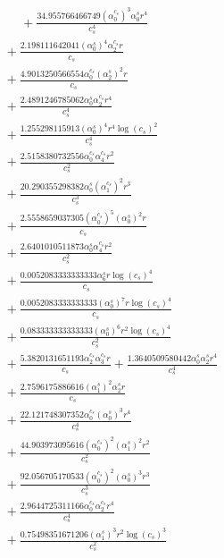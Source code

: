 \documentclass[10pt]{article}
\begin{document}
\begin{align*}
\phantom{R_{2,8}} &\phantom{={}}{}  + \frac{34.955766466749 \left(\alpha_{0}^{c_s}\right)^{3} \alpha_{0}^s r^{4}}{c_{s}^{4}} \\
&{}  + \frac{2.198111642041 \left(\alpha_{0}^s\right)^{4} \alpha_{2}^{c_s} r}{c_{s}} \\
&{}  + \frac{4.9013250566554 \alpha_{0}^{c_s} \left(\alpha_{2}^s\right)^{2} r}{c_{s}} \\
&{}  + \frac{2.4891246785062 \alpha_{0}^s \alpha_{2}^{c_s} r^{4}}{c_{s}^{4}} \\
&{}  + \frac{1.255298115913 \left(\alpha_{0}^s\right)^{4} r^{4} \log{\left(c_{s} \right)}^{2}}{c_{s}^{4}} \\
&{}  + \frac{2.5158380732556 \alpha_{0}^{c_s} \alpha_{4}^{c_s} r^{2}}{c_{s}^{2}} \\
&{}  + \frac{20.290355298382 \alpha_{0}^s \left(\alpha_{1}^{c_s}\right)^{2} r^{3}}{c_{s}^{3}} \\
&{}  + \frac{2.5558659037305 \left(\alpha_{0}^{c_s}\right)^{5} \left(\alpha_{0}^s\right)^{2} r}{c_{s}} \\
&{}  + \frac{2.6401010511873 \alpha_{0}^s \alpha_{4}^{c_s} r^{2}}{c_{s}^{2}} \\
&{}  + \frac{0.0052083333333333 \alpha_{6}^s r \log{\left(c_{s} \right)}^{4}}{c_{s}} \\
&{}  + \frac{0.0052083333333333 \left(\alpha_{0}^s\right)^{7} r \log{\left(c_{s} \right)}^{4}}{c_{s}} \\
&{}  + \frac{0.083333333333333 \left(\alpha_{0}^s\right)^{6} r^{2} \log{\left(c_{s} \right)}^{4}}{c_{s}^{2}} \\
&{}  + \frac{5.3820131651193 \alpha_{2}^{c_s} \alpha_{3}^{c_s} r}{c_{s}} + \frac{1.3640509580442 \alpha_{0}^s \alpha_{2}^s r^{4}}{c_{s}^{4}} \\
&{}  + \frac{2.7596175886616 \left(\alpha_{1}^s\right)^{2} \alpha_{2}^s r}{c_{s}} \\
&{}  + \frac{22.121748307352 \alpha_{0}^{c_s} \left(\alpha_{0}^s\right)^{3} r^{4}}{c_{s}^{4}} \\
&{}  + \frac{44.903973095616 \left(\alpha_{0}^{c_s}\right)^{2} \left(\alpha_{1}^s\right)^{2} r^{2}}{c_{s}^{2}} \\
&{}  + \frac{92.056705170533 \left(\alpha_{0}^{c_s}\right)^{2} \left(\alpha_{0}^s\right)^{3} r^{3}}{c_{s}^{3}} \\
&{}  + \frac{2.9644725311166 \alpha_{0}^{c_s} \alpha_{2}^{c_s} r^{4}}{c_{s}^{4}} \\
&{}  + \frac{0.75498351671206 \left(\alpha_{1}^s\right)^{3} r^{2} \log{\left(c_{s} \right)}^{3}}{c_{s}^{2}} \\

\end{align*}
\end{document}
